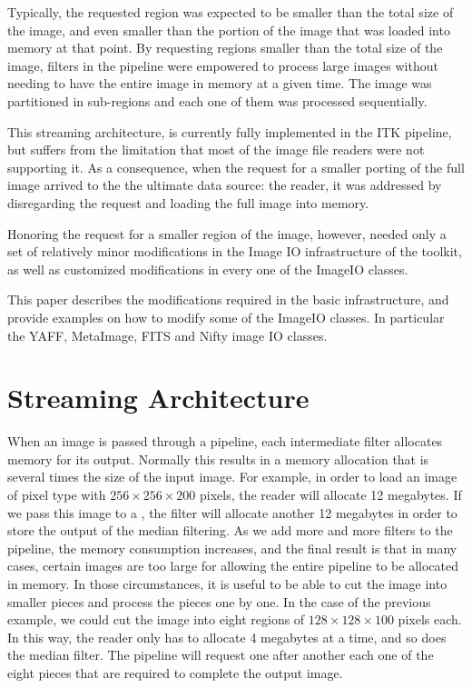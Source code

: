 \documentclass{InsightArticle}
\begin{document}
Typically, the requested region was expected to be smaller than the total size
of the image, and even smaller than the portion of the image that was loaded
into memory at that point. By requesting regions smaller than the total size of
the image, filters in the pipeline were empowered to process large images
without needing to have the entire image in memory at a given time. The image was
partitioned in sub-regions and each one of them was processed sequentially.

This streaming architecture, is currently fully implemented in the ITK
pipeline, but suffers from the limitation that most of the image file readers
were not supporting it. As a consequence, when the request for a smaller porting
of the full image arrived to the the ultimate data source: the reader, it was 
addressed by disregarding the request and loading the full image into memory.

Honoring the request for a smaller region of the image, however, needed only a set
of relatively minor modifications in the Image IO infrastructure of the toolkit, 
as well as customized modifications in every one of the ImageIO classes.

This paper describes the modifications required in the basic infrastructure,
and provide examples on how to modify some of the ImageIO classes. In
particular the YAFF, MetaImage, FITS and Nifty image IO classes.



\section{Streaming Architecture}

 When an image is passed through a pipeline, each intermediate filter allocates
 memory for its output. Normally this results in a memory allocation that is
 several times the size of the input image. For example, in order to load an
 image of pixel type  with $256 \times 256 \times 200$
 pixels, the reader will allocate 12 megabytes. If we pass this image to a
 , the filter will allocate another 12 megabytes in
 order to store the output of the median filtering. As we add more and more
 filters to the pipeline, the memory consumption increases, and the final
 result is that in many cases, certain images are too large for allowing the
 entire pipeline to be allocated in memory. In those circumstances, it is
 useful to be able to cut the image into smaller pieces and process the pieces
 one by one.  In the case of the previous example, we could cut the image into
 eight regions of $128 \times 128 \times 100$ pixels each. In this way, the
 reader only has to allocate 4 megabytes at a time, and so does the median
 filter. The pipeline will request one after another each one of the eight
 pieces that are required to complete the output image. 
 
\end{document}
